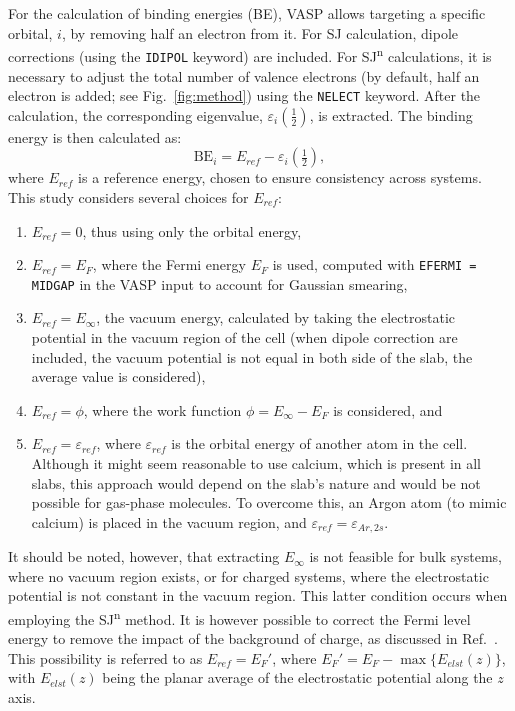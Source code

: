 \documentclass[journal=jpccck,manuscript=article]{achemso}
\begin{document}
For the calculation of binding energies (BE), VASP allows targeting a specific orbital, $i$, by removing half an electron from it. For SJ calculation, dipole corrections (using the \texttt{IDIPOL} keyword) are included. For SJ\textsuperscript{n} calculations, it is necessary to adjust the total number of valence electrons (by default, half an electron is added; see Fig.~\ref{fig:method}) using the \texttt{NELECT} keyword. After the calculation, the corresponding eigenvalue, $\varepsilon_i\left(\frac{1}{2}\right)$, is extracted. The binding energy is then calculated as:
\begin{equation}
	\text{BE}_i = 
	E_{ref}- \varepsilon_i\left(\tfrac{1}{2}\right), \label{eq:xpsbe}
\end{equation}
where $E_{ref}$ is a reference energy, chosen to ensure consistency across systems. This study considers several choices for $E_{ref}$:
\begin{enumerate}
	\item $E_{ref}=0$, thus using only the orbital energy,
	\item $E_{ref}=E_F$, where the Fermi energy $E_F$ is used, computed with \texttt{EFERMI = MIDGAP} in the VASP input to account for Gaussian smearing,
	\item $E_{ref}=E_\infty$, the vacuum energy, calculated by taking the electrostatic potential in the vacuum region of the cell (when dipole correction are included, the vacuum potential is not equal in both side of the slab, the average value is considered),
	\item $E_{ref}=\phi$, where the work function $\phi = E_\infty - E_F$ is considered\cite{kahnFermiLevelWork2015}, and
	\item $E_{ref}= \varepsilon_{ref}$, where $\varepsilon_{ref}$ is the orbital energy of another atom in the cell. Although it might seem reasonable to use calcium, which is present in all slabs, this approach would depend on the slab's nature and would be not possible for gas-phase molecules. To overcome this, an Argon atom (to mimic calcium) is placed in the vacuum region, and $\varepsilon_{ref}=\varepsilon_{Ar,2s}$.
\end{enumerate}
It should be noted, however, that extracting $E_\infty$ is not feasible for bulk systems, where no vacuum region exists, or for charged systems, where the electrostatic potential is not constant in the vacuum region. This latter condition occurs when employing the SJ\textsuperscript{n} method. It is however possible to correct the Fermi level energy to remove the impact of the background of charge, as discussed in Ref.~. This possibility is referred to as $E_{ref}=E_F'$, where $E_F' = E_F - \max\{E_{elst}(z)\}$, with $E_{elst}(z)$ being the planar average of the electrostatic potential along the $z$ axis.
\end{document}
